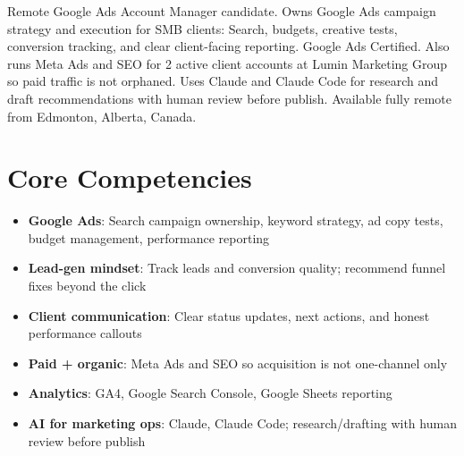 \documentclass[11pt,a4paper,sans]{moderncv}
\begin{document}
\makecvtitle

\vspace{6pt}
\small{Remote Google Ads Account Manager candidate. Owns Google Ads campaign strategy and execution for SMB clients: Search, budgets, creative tests, conversion tracking, and clear client-facing reporting. Google Ads Certified. Also runs Meta Ads and SEO for 2 active client accounts at Lumin Marketing Group so paid traffic is not orphaned. Uses Claude and Claude Code for research and draft recommendations with human review before publish. Available fully remote from Edmonton, Alberta, Canada.}

\section{Core Competencies}
\vspace{1pt}
\begin{itemize}
\item \textbf{Google Ads}: Search campaign ownership, keyword strategy, ad copy tests, budget management, performance reporting
\item \textbf{Lead-gen mindset}: Track leads and conversion quality; recommend funnel fixes beyond the click
\item \textbf{Client communication}: Clear status updates, next actions, and honest performance callouts
\item \textbf{Paid + organic}: Meta Ads and SEO so acquisition is not one-channel only
\item \textbf{Analytics}: GA4, Google Search Console, Google Sheets reporting
\item \textbf{AI for marketing ops}: Claude, Claude Code; research/drafting with human review before publish
\end{itemize}
\end{document}
